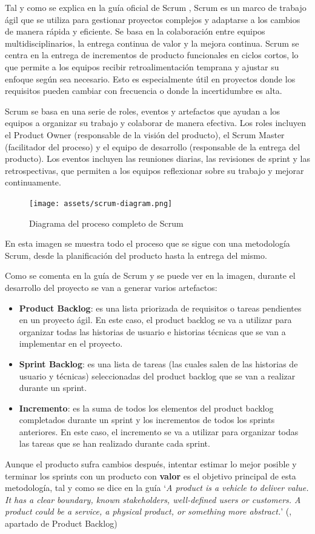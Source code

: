 Tal y como se explica en la guía oficial de Scrum \parencite{scrum-guide}, Scrum es un marco de trabajo ágil que se utiliza para gestionar proyectos complejos y adaptarse a los cambios de manera rápida y eficiente. Se basa en la colaboración entre equipos multidisciplinarios, la entrega continua de valor y la mejora continua.
Scrum se centra en la entrega de incrementos de producto funcionales en ciclos cortos, lo que permite a los equipos recibir retroalimentación temprana y ajustar su enfoque según sea necesario. Esto es especialmente útil en proyectos donde los requisitos pueden cambiar con frecuencia o donde la incertidumbre es alta.

Scrum se basa en una serie de roles, eventos y artefactos que ayudan a los equipos a organizar su trabajo y colaborar de manera efectiva. Los roles incluyen el Product Owner (responsable de la visión del producto), el Scrum Master (facilitador del proceso) y el equipo de desarrollo (responsable de la entrega del producto). Los eventos incluyen las reuniones diarias, las revisiones de sprint y las retrospectivas, que permiten a los equipos reflexionar sobre su trabajo y mejorar continuamente.

\begin{figure}[H]
  \centering
  \texttt{[image: assets/scrum-diagram.png]}
  \caption{Diagrama del proceso completo de Scrum \parencite{scrum-diagram}}
  \label{fig:scrum-diagram}
\end{figure}

En esta imagen se muestra todo el proceso que se sigue con una metodología Scrum, desde la planificación del producto hasta la entrega del mismo.

Como se comenta en la guía de Scrum y se puede ver en la imagen, durante el desarrollo del proyecto se van a generar varios artefactos:
\begin{itemize}
    \item \textbf{Product Backlog}: es una lista priorizada de requisitos o tareas pendientes en un proyecto ágil. En este caso, el product backlog se va a utilizar para organizar todas las historias de usuario e historias técnicas que se van a implementar en el proyecto.
    \item \textbf{Sprint Backlog}: es una lista de tareas (las cuales salen de las historias de usuario y técnicas) seleccionadas del product backlog que se van a realizar durante un sprint.
    \item \textbf{Incremento}: es la suma de todos los elementos del product backlog completados durante un sprint y los incrementos de todos los sprints anteriores. En este caso, el incremento se va a utilizar para organizar todas las tareas que se han realizado durante cada sprint.
\end{itemize}
Aunque el producto sufra cambios después, intentar estimar lo mejor posible y terminar los sprints con un producto con \textbf{valor} es el objetivo principal de esta metodología, tal y como se dice en la guía `\textit{A product is a vehicle to deliver value. It has a clear boundary, known stakeholders, well-defined users or customers. A product could be a service, a physical product, or something more abstract.}' (\cite{scrum-guide}, apartado de Product Backlog)

